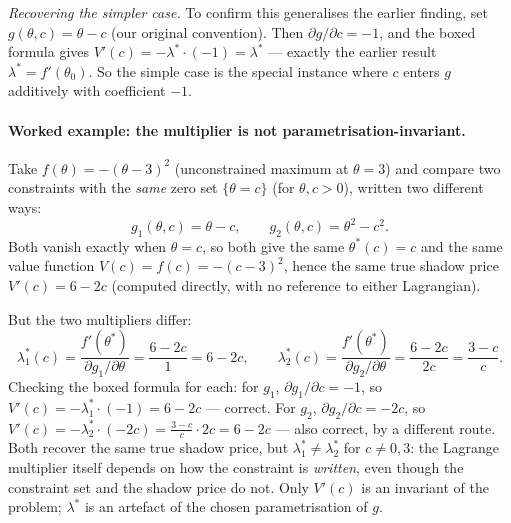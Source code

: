 \documentclass[a4paper,oneside,12pt]{extarticle}
\theoremstyle{plain}
\theoremstyle{definition}
\theoremstyle{remark}
\begin{document}
\emph{Recovering the simpler case.}
To confirm this generalises the earlier finding, set
$g(\theta,c) = \theta - c$ (our original convention).  Then
$\partial g/\partial c = -1$, and the boxed formula gives
$V'(c) = -\lambda^*\cdot(-1) = \lambda^*$ --- exactly the earlier
result $\lambda^*=f'(\theta_0)$.  So the simple case is the special
instance where $c$ enters $g$ additively with coefficient $-1$.

\paragraph{Worked example: the multiplier is not parametrisation-invariant.}
Take $f(\theta) = -(\theta-3)^2$ (unconstrained maximum at
$\theta=3$) and compare two constraints with the \emph{same} zero
set $\{\theta = c\}$ (for $\theta,c>0$), written two different ways:
\[
  g_1(\theta,c) = \theta - c, \qquad
  g_2(\theta,c) = \theta^2 - c^2.
\]
Both vanish exactly when $\theta=c$, so both give the same
$\theta^*(c) = c$ and the same value function
$V(c) = f(c) = -(c-3)^2$, hence the same true shadow price
$V'(c) = 6-2c$ (computed directly, with no reference to either
Lagrangian).

But the two multipliers differ:
\[
  \lambda_1^*(c) = \frac{f'(\theta^*)}{\partial g_1/\partial\theta}
  = \frac{6-2c}{1} = 6-2c,
  \qquad
  \lambda_2^*(c) = \frac{f'(\theta^*)}{\partial g_2/\partial\theta}
  = \frac{6-2c}{2c} = \frac{3-c}{c}.
\]
Checking the boxed formula for each: for $g_1$,
$\partial g_1/\partial c = -1$, so
$V'(c) = -\lambda_1^*\cdot(-1) = 6-2c$ --- correct.
For $g_2$, $\partial g_2/\partial c = -2c$, so
$V'(c) = -\lambda_2^*\cdot(-2c) = \frac{3-c}{c}\cdot 2c = 6-2c$
--- also correct, by a different route.  Both recover the same true
shadow price, but $\lambda_1^*\ne\lambda_2^*$ for $c\ne 0,3$: the
Lagrange multiplier itself depends on how the constraint is
\emph{written}, even though the constraint set and the shadow price
do not.  Only $V'(c)$ is an invariant of the problem; $\lambda^*$ is
an artefact of the chosen parametrisation of $g$.
\end{document}
